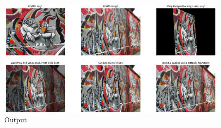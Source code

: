 \documentclass[a4paper]{article}
\begin{document}
\begin{figure}[!htb]
  \centering
  \includegraphics[width=\textwidth]{images/q3.png}
  \caption{Output}
  \label{q3}
\end{figure}
\end{document}
